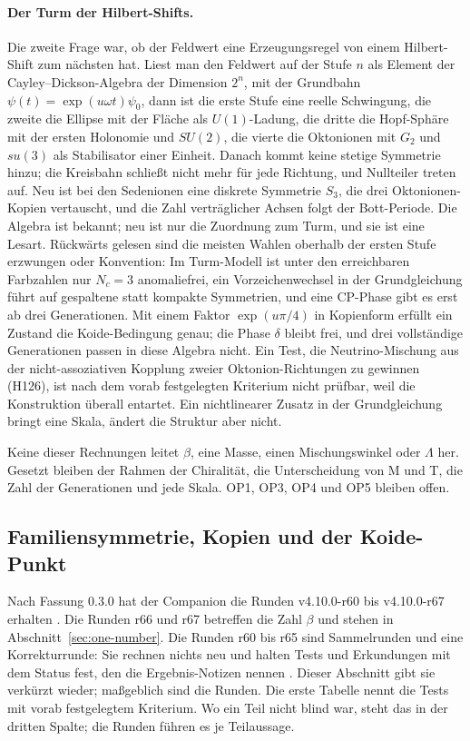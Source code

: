 \paragraph{Der Turm der Hilbert-Shifts.}
Die zweite Frage war, ob der Feldwert eine Erzeugungsregel von einem Hilbert-Shift zum nächsten hat. Liest man den Feldwert auf der
Stufe \(n\) als Element der Cayley--Dickson-Algebra der Dimension \(2^n\), mit der Grundbahn \(\psi(t)=\exp(u\omega t)\psi_0\), dann ist die erste
Stufe eine reelle Schwingung, die zweite die Ellipse mit der Fläche als \(U(1)\)-Ladung, die dritte die Hopf-Sphäre mit der ersten
Holonomie und \(SU(2)\), die vierte die Oktonionen mit \(G_2\) und \(su(3)\) als Stabilisator einer Einheit. Danach kommt keine stetige
Symmetrie hinzu; die Kreisbahn schließt nicht mehr für jede Richtung, und Nullteiler treten auf. Neu ist bei den Sedenionen eine diskrete
Symmetrie \(S_3\), die drei Oktonionen-Kopien vertauscht, und die Zahl verträglicher Achsen folgt der Bott-Periode. Die Algebra ist bekannt;
neu ist nur die Zuordnung zum Turm, und sie ist eine Lesart. Rückwärts gelesen sind die meisten Wahlen oberhalb der ersten Stufe erzwungen
oder Konvention: Im Turm-Modell ist unter den erreichbaren Farbzahlen nur \(N_c=3\) anomaliefrei, ein Vorzeichenwechsel in der
Grundgleichung führt auf gespaltene statt kompakte Symmetrien, und eine CP-Phase gibt es erst ab drei Generationen. Mit einem Faktor
\(\exp(u\pi/4)\) in Kopienform erfüllt ein Zustand die Koide-Bedingung genau; die Phase \(\delta\) bleibt frei, und drei vollständige
Generationen passen in diese Algebra nicht. Ein Test, die Neutrino-Mischung aus der nicht-assoziativen Kopplung zweier Oktonion-Richtungen
zu gewinnen (H126), ist nach dem vorab festgelegten Kriterium nicht prüfbar, weil die Konstruktion überall entartet. Ein nichtlinearer
Zusatz in der Grundgleichung bringt eine Skala, ändert die Struktur aber nicht.

Keine dieser Rechnungen leitet \(\beta\), eine Masse, einen Mischungswinkel oder \(\Lambda\) her. Gesetzt bleiben der Rahmen der
Chiralität, die Unterscheidung von M und T, die Zahl der Generationen und jede Skala. OP1, OP3, OP4 und OP5 bleiben offen.

\subsection{Familiensymmetrie, Kopien und der Koide-Punkt}
\label{sec:family-copies-koide}

Nach Fassung 0.3.0 hat der Companion die Runden v4.10.0-r60 bis v4.10.0-r67 erhalten \cite{layers}. Die Runden r66 und r67 betreffen die
Zahl \(\beta\) und stehen in Abschnitt~\ref{sec:one-number}. Die Runden r60 bis r65 sind Sammelrunden und eine Korrekturrunde: Sie rechnen
nichts neu und halten Tests und Erkundungen mit dem Status fest, den die Ergebnis-Notizen nennen \cite{roundsr60r65}. Dieser Abschnitt gibt
sie verkürzt wieder; maßgeblich sind die Runden. Die erste Tabelle nennt die Tests mit vorab festgelegtem Kriterium. Wo ein Teil nicht blind
war, steht das in der dritten Spalte; die Runden führen es je Teilaussage.

